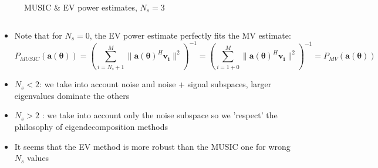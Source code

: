 \documentclass[UKenglish,8pt,aspectratio=1610]{beamer}
\begin{document}
\begin{frame}
\begin{columns}
\begin{column}{0.33\textwidth}
\begin{figure}[h!]
			\caption{MUSIC \& EV power estimates, $N_s=3$}
	\end{figure}
\end{column}
\end{columns}
\begin{itemize}
	\item Note that for $N_s=0$, the EV power estimate perfectly fits the MV estimate:
	\begin{equation}
	P_{MUSIC}(\mathbf{a(\theta)})=\left(\sum_{i=N_s+1}^{M}\rVert \mathbf{a(\theta)}^H\mathbf{v_i}\rVert^2\right)^{-1}=\left(\sum_{i=1+0}^M\rVert \mathbf{a(\theta)}^H\mathbf{v_i}\rVert^2\right)^{-1}=P_{MV}(\mathbf{a(\theta)})
	\end{equation} 
\item $N_s<2$: we take into account noise and noise + signal subspaces, larger eigenvalues dominate the others
\item $N_s>2$ : we take into account only the noise subspace so we 'respect' the philosophy of eigendecomposition methods 
\item It seems that the EV method is more robust than the MUSIC one for wrong $N_s$ values
\end{itemize}

\end{frame}
\end{document}
